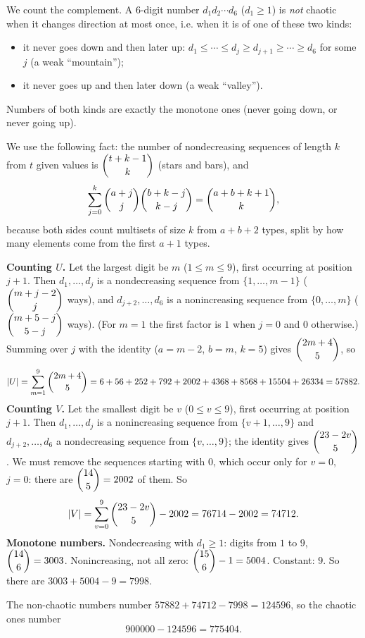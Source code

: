 We count the complement. A $6$-digit number $d_1d_2\cdots d_6$ ($d_1\ge1$) is \emph{not} chaotic when it changes direction at most once, i.e. when it is of one of these two kinds:
\begin{itemize}
\item[$U$:] it never goes down and then later up: $d_1\le\cdots\le d_j\ge d_{j+1}\ge\cdots\ge d_6$ for some $j$ (a weak ``mountain'');
\item[$V$:] it never goes up and then later down (a weak ``valley'').
\end{itemize}
Numbers of both kinds are exactly the monotone ones (never going down, or never going up).

We use the following fact: the number of nondecreasing sequences of length $k$ from $t$ given values is $\dbinom{t+k-1}{k}$ (stars and bars), and
\[\sum_{j=0}^{k}\dbinom{a+j}{j}\dbinom{b+k-j}{k-j}=\dbinom{a+b+k+1}{k},\]
because both sides count multisets of size $k$ from $a+b+2$ types, split by how many elements come from the first $a+1$ types.

\textbf{Counting $U$.} Let the largest digit be $m$ ($1\le m\le9$), first occurring at position $j+1$. Then $d_1,\dots,d_j$ is a nondecreasing sequence from $\{1,\dots,m-1\}$ ($\dbinom{m+j-2}{j}$ ways), and $d_{j+2},\dots,d_6$ is a nonincreasing sequence from $\{0,\dots,m\}$ ($\dbinom{m+5-j}{5-j}$ ways). (For $m=1$ the first factor is $1$ when $j=0$ and $0$ otherwise.) Summing over $j$ with the identity ($a=m-2$, $b=m$, $k=5$) gives $\dbinom{2m+4}{5}$, so
\[|U|=\sum_{m=1}^{9}\dbinom{2m+4}{5}=6+56+252+792+2002+4368+8568+15504+26334=57882.\]
\textbf{Counting $V$.} Let the smallest digit be $v$ ($0\le v\le9$), first occurring at position $j+1$. Then $d_1,\dots,d_j$ is a nonincreasing sequence from $\{v+1,\dots,9\}$ and $d_{j+2},\dots,d_6$ a nondecreasing sequence from $\{v,\dots,9\}$; the identity gives $\dbinom{23-2v}{5}$. We must remove the sequences starting with $0$, which occur only for $v=0$, $j=0$: there are $\dbinom{14}{5}=2002$ of them. So
\[|V|=\sum_{v=0}^{9}\dbinom{23-2v}{5}-2002=76714-2002=74712.\]
\textbf{Monotone numbers.} Nondecreasing with $d_1\ge1$: digits from $1$ to $9$, $\dbinom{14}{6}=3003$. Nonincreasing, not all zero: $\dbinom{15}{6}-1=5004$. Constant: $9$. So there are $3003+5004-9=7998$.

The non-chaotic numbers number $57882+74712-7998=124596$, so the chaotic ones number
\[900000-124596=\boxed{775404}.\]
